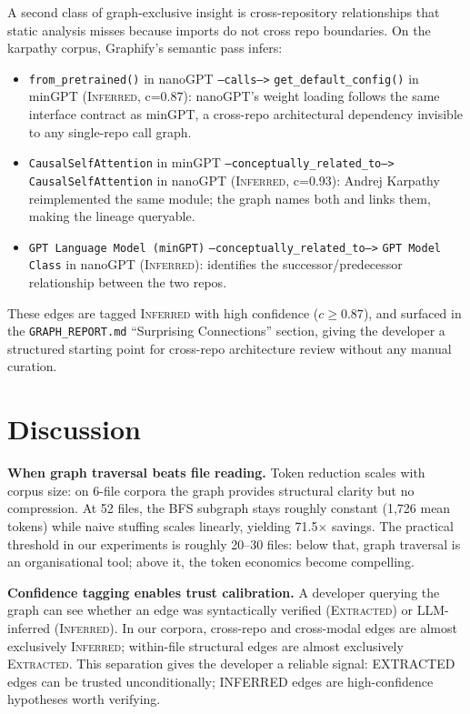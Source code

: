 A second class of graph-exclusive insight is cross-repository relationships that
static analysis misses because imports do not cross repo boundaries. On the
karpathy corpus, Graphify's semantic pass infers:

\begin{itemize}
  \item \texttt{from\_pretrained()} in nanoGPT \texttt{--calls-->}
        \texttt{get\_default\_config()} in minGPT (\textsc{Inferred}, c=0.87):
        nanoGPT's weight loading follows the same interface contract as minGPT,
        a cross-repo architectural dependency invisible to any single-repo call
        graph.
  \item \texttt{CausalSelfAttention} in minGPT \texttt{--conceptually\_related\_to-->}
        \texttt{CausalSelfAttention} in nanoGPT (\textsc{Inferred}, c=0.93):
        Andrej Karpathy reimplemented the same module; the graph names both and
        links them, making the lineage queryable.
  \item \texttt{GPT Language Model (minGPT)} \texttt{--conceptually\_related\_to-->}
        \texttt{GPT Model Class} in nanoGPT (\textsc{Inferred}): identifies the
        successor/predecessor relationship between the two repos.
\end{itemize}

\noindent These edges are tagged \textsc{Inferred} with high confidence
($c \geq 0.87$), and surfaced in the \texttt{GRAPH\_REPORT.md} ``Surprising
Connections'' section, giving the developer a structured starting point for
cross-repo architecture review without any manual curation.

\section{Discussion}
\label{sec:discussion}

\textbf{When graph traversal beats file reading.} Token reduction scales with
corpus size: on 6-file corpora the graph provides structural clarity but no
compression. At 52 files, the BFS subgraph stays roughly constant (1,726 mean
tokens) while naive stuffing scales linearly, yielding 71.5$\times$ savings. The
practical threshold in our experiments is roughly 20--30 files: below that,
graph traversal is an organisational tool; above it, the token economics become
compelling.

\textbf{Confidence tagging enables trust calibration.} A developer querying the
graph can see whether an edge was syntactically verified (\textsc{Extracted}) or
LLM-inferred (\textsc{Inferred}). In our corpora, cross-repo and cross-modal
edges are almost exclusively \textsc{Inferred}; within-file structural edges are
almost exclusively \textsc{Extracted}. This separation gives the developer a
reliable signal: EXTRACTED edges can be trusted unconditionally; INFERRED edges
are high-confidence hypotheses worth verifying.

